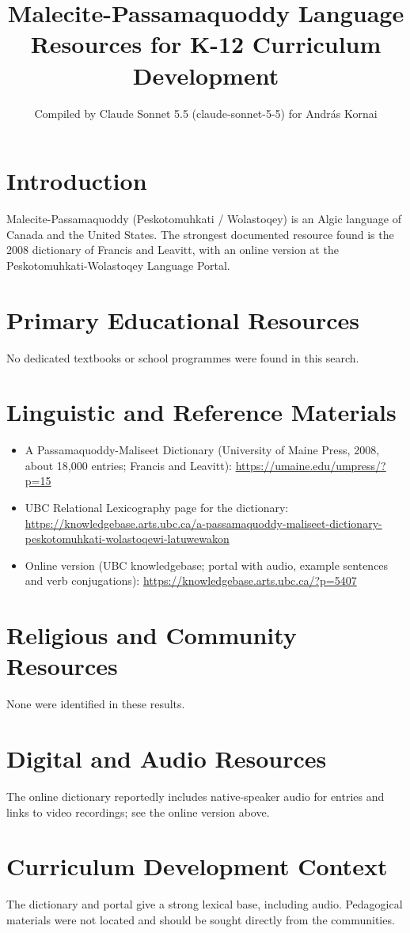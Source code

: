 \documentclass[12pt]{article}
\title{Malecite-Passamaquoddy Language Resources for K-12 Curriculum Development}
\author{Compiled by Claude Sonnet 5.5 (claude-sonnet-5-5) for Andr\'as Kornai}
\date{}
\begin{document}
\maketitle
\section{Introduction}
Malecite-Passamaquoddy (Peskotomuhkati / Wolastoqey) is an Algic language of Canada and the United States. The strongest documented resource found is the 2008 dictionary of Francis and Leavitt, with an online version at the Peskotomuhkati-Wolastoqey Language Portal.
\section{Primary Educational Resources}
No dedicated textbooks or school programmes were found in this search.
\section{Linguistic and Reference Materials}
\begin{itemize}
\item A Passamaquoddy-Maliseet Dictionary (University of Maine Press, 2008, about 18,000 entries; Francis and Leavitt): \url{https://umaine.edu/umpress/?p=15}
\item UBC Relational Lexicography page for the dictionary: \url{https://knowledgebase.arts.ubc.ca/a-passamaquoddy-maliseet-dictionary-peskotomuhkati-wolastoqewi-latuwewakon}
\item Online version (UBC knowledgebase; portal with audio, example sentences and verb conjugations): \url{https://knowledgebase.arts.ubc.ca/?p=5407}
\end{itemize}
\section{Religious and Community Resources}
None were identified in these results.
\section{Digital and Audio Resources}
The online dictionary reportedly includes native-speaker audio for entries and links to video recordings; see the online version above.
\section{Curriculum Development Context}
The dictionary and portal give a strong lexical base, including audio. Pedagogical materials were not located and should be sought directly from the communities.
\end{document}
